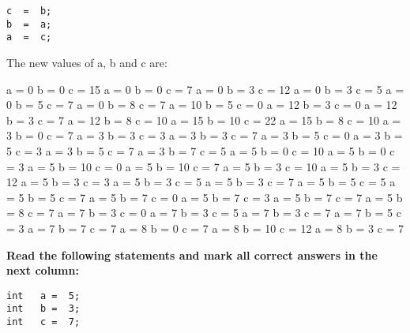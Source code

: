 \documentclass[10pt]{exam}
\begin{document}
\begin{questions}
\begin{minipage}[t][][t]{0.18\textwidth}
\begin{lstlisting}
c  =  b;
b  =  a;
a  =  c;
  \end{lstlisting}
\end{minipage}
  \hfill
\begin{minipage}[t][][t]{0.75\textwidth}
  The new values of a, b and c are:
  \begin{multicols*}{3}
\begin{checkboxes}
    \choice a = 0 b = 0 c = 15
    \choice a = 0 b = 0 c = 7
    \choice a = 0 b = 3 c = 12
    \choice a = 0 b = 3 c = 5
    \choice a = 0 b = 5 c = 7
    \choice a = 0 b = 8 c = 7
    \choice a = 10 b = 5 c = 0
    \choice a = 12 b = 3 c = 0
    \choice a = 12 b = 3 c = 7
    \choice a = 12 b = 8 c = 10
    \choice a = 15 b = 10 c = 22
    \choice a = 15 b = 8 c = 10
    \choice a = 3 b = 0 c = 7
    \choice a = 3 b = 3 c = 3
    \choice a = 3 b = 3 c = 7
    \choice a = 3 b = 5 c = 0
    \choice a = 3 b = 5 c = 3
    \choice a = 3 b = 5 c = 7
    \choice a = 3 b = 7 c = 5
    \choice a = 5 b = 0 c = 10
    \choice a = 5 b = 0 c = 3
    \choice a = 5 b = 10 c = 0
    \choice a = 5 b = 10 c = 7
    \choice a = 5 b = 3 c = 10
    \choice a = 5 b = 3 c = 12
    \choice a = 5 b = 3 c = 3
    \choice a = 5 b = 3 c = 5
    \choice a = 5 b = 3 c = 7
    \choice a = 5 b = 5 c = 5
    \choice a = 5 b = 5 c = 7
    \choice a = 5 b = 7 c = 0
    \choice a = 5 b = 7 c = 3
    \choice a = 5 b = 7 c = 7
    \choice a = 5 b = 8 c = 7
    \choice a = 7 b = 3 c = 0
    \choice a = 7 b = 3 c = 5
    \choice a = 7 b = 3 c = 7
    \choice a = 7 b = 5 c = 3
    \choice a = 7 b = 7 c = 7
    \choice a = 8 b = 0 c = 7
    \choice a = 8 b = 10 c = 12
    \choice a = 8 b = 3 c = 7
  \end{checkboxes}
\end{multicols*}
\end{minipage}

\vspace{1cm}  \begin{minipage}[t][][t]{0.18\textwidth}
\question \bf Read the following statements and mark all correct answers in the next column: \raggedright
  \begin{lstlisting}
int   a =  5;
int   b =  3;
int   c =  7;


\end{lstlisting}
\end{minipage}
\end{questions}
\end{document}
